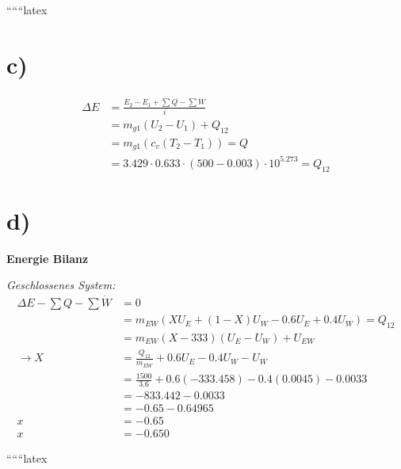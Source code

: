 ``````latex


\section*{c)}

\begin{align*}
\Delta E &= \frac{E_2 - E_1 + \sum Q - \sum \dot{W}}{i} \\
&= m_{g1} (U_2 - U_1) + Q_{12} \\
&= m_{g1} \left( c_v (T_2 - T_1) \right) = Q \\
&= 3.429 \cdot 0.633 \cdot (500 - 0.003) \cdot 10^{5.273} = Q_{12}
\end{align*}

\section*{d)}

\textbf{Energie Bilanz}

\textit{Geschlossenes System:} 
\begin{align*}
\Delta E - \sum Q - \sum \dot{W} &= 0 \\
&= m_{EW} \left( X U_E + (1 - X) U_W - 0.6 U_E + 0.4 U_W \right) = Q_{12} \\
&= m_{EW} \left( X - 333 \right) \left( U_E - U_W \right) + U_{EW} \\
\rightarrow X &= \frac{Q_{12}}{m_{EW}} + 0.6 U_E - 0.4 U_W - U_W \\
&= \frac{1500}{3.6} + 0.6 \left( -333.458 \right) - 0.4 \left( 0.0045 \right) - 0.0033 \\
&= -833.442 - 0.0033 \\
&= -0.65 - 0.64965 \\
x &= -0.65 \\
x &= -0.650
\end{align*}

``````latex


